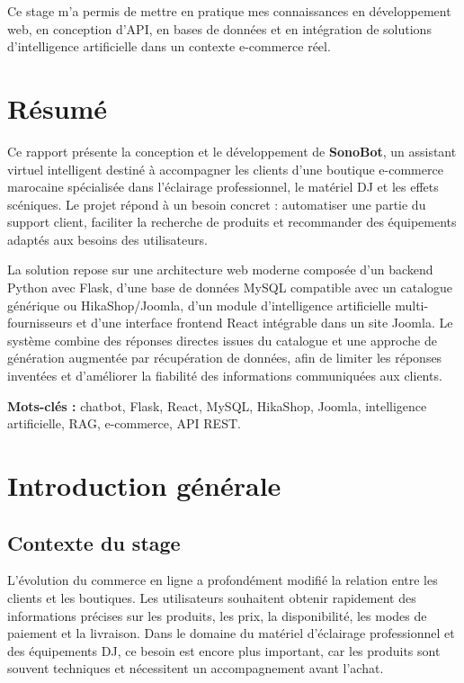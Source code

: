 \documentclass[12pt,a4paper]{report}
\begin{document}
Ce stage m'a permis de mettre en pratique mes connaissances en développement web, en conception d'API, en bases de données et en intégration de solutions d'intelligence artificielle dans un contexte e-commerce réel.

\chapter*{Résumé}

Ce rapport présente la conception et le développement de \textbf{SonoBot}, un assistant virtuel intelligent destiné à accompagner les clients d'une boutique e-commerce marocaine spécialisée dans l'éclairage professionnel, le matériel DJ et les effets scéniques. Le projet répond à un besoin concret : automatiser une partie du support client, faciliter la recherche de produits et recommander des équipements adaptés aux besoins des utilisateurs.

La solution repose sur une architecture web moderne composée d'un backend Python avec Flask, d'une base de données MySQL compatible avec un catalogue générique ou HikaShop/Joomla, d'un module d'intelligence artificielle multi-fournisseurs et d'une interface frontend React intégrable dans un site Joomla. Le système combine des réponses directes issues du catalogue et une approche de génération augmentée par récupération de données, afin de limiter les réponses inventées et d'améliorer la fiabilité des informations communiquées aux clients.

\textbf{Mots-clés :} chatbot, Flask, React, MySQL, HikaShop, Joomla, intelligence artificielle, RAG, e-commerce, API REST.

\tableofcontents
\listoftables

\chapter{Introduction générale}

\section{Contexte du stage}

L'évolution du commerce en ligne a profondément modifié la relation entre les clients et les boutiques. Les utilisateurs souhaitent obtenir rapidement des informations précises sur les produits, les prix, la disponibilité, les modes de paiement et la livraison. Dans le domaine du matériel d'éclairage professionnel et des équipements DJ, ce besoin est encore plus important, car les produits sont souvent techniques et nécessitent un accompagnement avant l'achat.
\end{document}
